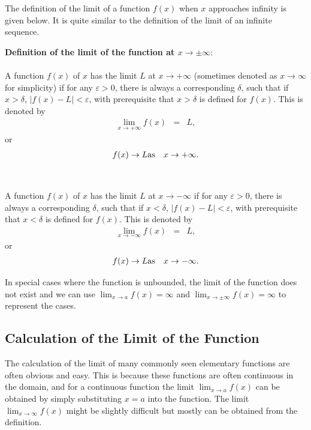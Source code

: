The definition of the limit of a function $f(x)$ when $x$ approaches infinity is given below. It is quite similar to the definition of the limit of an infinite sequence.
\begin{VF}
\textbf{Definition of the limit of the function at $x\rightarrow \pm \infty$}:
\\
\\
\noindent A function $f(x)$ of $x$ has the limit $L$ at $x \rightarrow +\infty$ (sometimes denoted as $x \rightarrow \infty$ for simplicity) if for any $\varepsilon > 0$, there is always a corresponding $\delta$, such that if $x > \delta$, $|f(x)-L| < \varepsilon$, with prerequisite that $x > \delta$ is defined for $f(x)$. This is denoted by
\begin{eqnarray}
   \lim_{x\rightarrow +\infty} f(x) &=& L, \nonumber
\end{eqnarray}
or
\begin{eqnarray}
  f(x) \rightarrow L & \textup{as} & x \rightarrow +\infty. \nonumber
\end{eqnarray}
\\
\\
\noindent A function $f(x)$ of $x$ has the limit $L$ at $x \rightarrow -\infty$ if for any $\varepsilon > 0$, there is always a corresponding $\delta$, such that if $x < \delta$, $|f(x)-L| < \varepsilon$, with prerequisite that $x < \delta$ is defined for $f(x)$. This is denoted by
\begin{eqnarray}
   \lim_{x\rightarrow -\infty} f(x) &=& L, \nonumber
\end{eqnarray}
or
\begin{eqnarray}
  f(x) \rightarrow L & \textup{as} & x \rightarrow -\infty. \nonumber
\end{eqnarray}
\end{VF}

In special cases where the function is unbounded, the limit of the function does not exist and we can use $\lim_{x\rightarrow a}f(x) =  \infty$ and $\lim_{x\rightarrow \pm \infty}f(x) = \infty$ to represent the cases.

\subsection{Calculation of the Limit of the Function} \label{ch1subsec:calculationlimitfunction}

The calculation of the limit of many commonly seen elementary functions are often obvious and easy. This is because these functions are often continuous in the domain, and for a continuous function the limit $\lim_{x\rightarrow a}f(x)$ can be obtained by simply substituting $x=a$ into the function. The limit $\lim_{x\rightarrow \infty}f(x)$ might be slightly difficult but mostly can be obtained from the definition.

